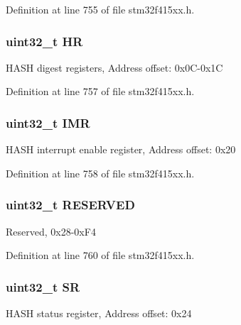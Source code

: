 Definition at line 755 of file stm32f415xx.\+h.

\subsubsection[{\texorpdfstring{HR}{HR}}]{ uint32\+\_\+t HR}\hypertarget{struct_h_a_s_h___type_def_aa218f0052087d560f8a12bcb5e14310a}{}\label{struct_h_a_s_h___type_def_aa218f0052087d560f8a12bcb5e14310a}
H\+A\+SH digest registers, Address offset\+: 0x0\+C-\/0x1C 

Definition at line 757 of file stm32f415xx.\+h.

\subsubsection[{\texorpdfstring{I\+MR}{IMR}}]{ uint32\+\_\+t I\+MR}\hypertarget{struct_h_a_s_h___type_def_ae845b86e973b4bf8a33c447c261633f6}{}\label{struct_h_a_s_h___type_def_ae845b86e973b4bf8a33c447c261633f6}
H\+A\+SH interrupt enable register, Address offset\+: 0x20 

Definition at line 758 of file stm32f415xx.\+h.

\subsubsection[{\texorpdfstring{R\+E\+S\+E\+R\+V\+ED}{RESERVED}}]{\setlength{\rightskip}{0pt plus 5cm}uint32\+\_\+t R\+E\+S\+E\+R\+V\+ED}\hypertarget{struct_h_a_s_h___type_def_a71a069697b12674f9ad8311d47326fc9}{}\label{struct_h_a_s_h___type_def_a71a069697b12674f9ad8311d47326fc9}
Reserved, 0x28-\/0x\+F4 

Definition at line 760 of file stm32f415xx.\+h.

\subsubsection[{\texorpdfstring{SR}{SR}}]{ uint32\+\_\+t SR}\hypertarget{struct_h_a_s_h___type_def_af6aca2bbd40c0fb6df7c3aebe224a360}{}\label{struct_h_a_s_h___type_def_af6aca2bbd40c0fb6df7c3aebe224a360}
H\+A\+SH status register, Address offset\+: 0x24 


